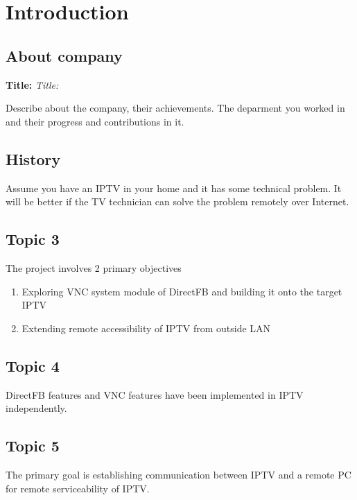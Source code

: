 \chapter{Introduction}

\section{About company}
\textbf{Title:} 
\textit{Title:}

Describe about the company, their achievements. The deparment you worked in and their progress and contributions in it.

\section{History}
Assume you have an IPTV in your home and it has some technical problem. It will be better if the TV technician can solve the problem remotely over Internet. 

\section{Topic 3}
The project involves 2 primary objectives
\begin{enumerate}
\item Exploring VNC system module of DirectFB and building it onto the target IPTV
\item Extending remote accessibility of IPTV from outside LAN
\end{enumerate}

\section{Topic 4}
DirectFB features and VNC features have been implemented in IPTV independently.

\section{Topic 5}
The primary goal is establishing communication between IPTV and a remote PC for remote serviceability of IPTV.




